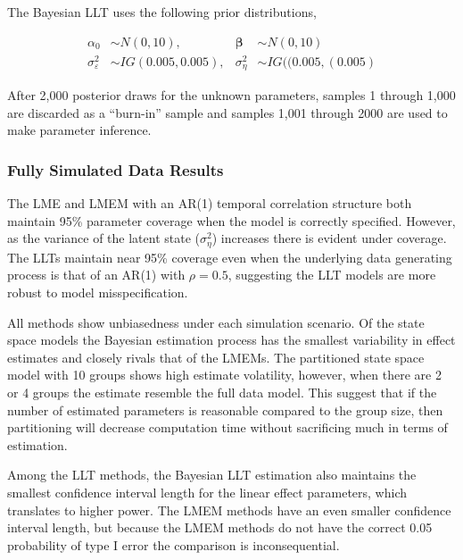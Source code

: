 \documentclass[
]{article}
\begin{document}
The Bayesian LLT uses the following prior distributions,

\begin{equation*}
\begin{aligned}
\alpha_0 &\sim N(0, 10), \ \ \ &\boldsymbol{\beta} &\sim N(0, 10)\\
\sigma^2_\varepsilon &\sim IG(0.005, 0.005),  &\sigma^2_\eta &\sim IG((0.005, (0.005)
\end{aligned}
\end{equation*}

After 2,000 posterior draws for the unknown parameters, samples 1 through 1,000 are discarded as a ``burn-in'' sample and samples 1,001 through 2000 are used to make parameter inference.

\hypertarget{fully-simulated-data-results}{%
\subsubsection{Fully Simulated Data Results}\label{fully-simulated-data-results}}

The LME and LMEM with an AR(1) temporal correlation structure both maintain 95\% parameter coverage when the model is correctly specified. However, as the variance of the latent state (\(\sigma^2_\eta\)) increases there is evident under coverage. The LLTs maintain near 95\% coverage even when the underlying data generating process is that of an AR(1) with \(\rho = 0.5\), suggesting the LLT models are more robust to model misspecification.

All methods show unbiasedness under each simulation scenario. Of the state space models the Bayesian estimation process has the smallest variability in effect estimates and closely rivals that of the LMEMs. The partitioned state space model with 10 groups shows high estimate volatility, however, when there are 2 or 4 groups the estimate resemble the full data model. This suggest that if the number of estimated parameters is reasonable compared to the group size, then partitioning will decrease computation time without sacrificing much in terms of estimation.

Among the LLT methods, the Bayesian LLT estimation also maintains the smallest confidence interval length for the linear effect parameters, which translates to higher power. The LMEM methods have an even smaller confidence interval length, but because the LMEM methods do not have the correct 0.05 probability of type I error the comparison is inconsequential.
\end{document}
